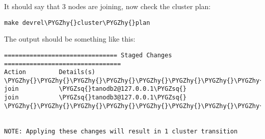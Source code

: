 \documentclass[letterpaper,10pt,english]{sphinxmanual}
\def\PYGZhy{\char`\-}
\def\PYGZsq{\char`\'}
\renewcommand\PYGZsq{\textquotesingle}
\begin{document}
It should say that 3 nodes are joining, now check the cluster plan:

\begin{Verbatim}[commandchars=\\\{\}]
make devrel\PYGZhy{}cluster\PYGZhy{}plan
\end{Verbatim}

The output should be something like this:

\begin{Verbatim}[commandchars=\\\{\}]
=============================== Staged Changes ================================
Action         Details(s)
\PYGZhy{}\PYGZhy{}\PYGZhy{}\PYGZhy{}\PYGZhy{}\PYGZhy{}\PYGZhy{}\PYGZhy{}\PYGZhy{}\PYGZhy{}\PYGZhy{}\PYGZhy{}\PYGZhy{}\PYGZhy{}\PYGZhy{}\PYGZhy{}\PYGZhy{}\PYGZhy{}\PYGZhy{}\PYGZhy{}\PYGZhy{}\PYGZhy{}\PYGZhy{}\PYGZhy{}\PYGZhy{}\PYGZhy{}\PYGZhy{}\PYGZhy{}\PYGZhy{}\PYGZhy{}\PYGZhy{}\PYGZhy{}\PYGZhy{}\PYGZhy{}\PYGZhy{}\PYGZhy{}\PYGZhy{}\PYGZhy{}\PYGZhy{}\PYGZhy{}\PYGZhy{}\PYGZhy{}\PYGZhy{}\PYGZhy{}\PYGZhy{}\PYGZhy{}\PYGZhy{}\PYGZhy{}\PYGZhy{}\PYGZhy{}\PYGZhy{}\PYGZhy{}\PYGZhy{}\PYGZhy{}\PYGZhy{}\PYGZhy{}\PYGZhy{}\PYGZhy{}\PYGZhy{}\PYGZhy{}\PYGZhy{}\PYGZhy{}\PYGZhy{}\PYGZhy{}\PYGZhy{}\PYGZhy{}\PYGZhy{}\PYGZhy{}\PYGZhy{}\PYGZhy{}\PYGZhy{}\PYGZhy{}\PYGZhy{}\PYGZhy{}\PYGZhy{}\PYGZhy{}\PYGZhy{}\PYGZhy{}\PYGZhy{}
join           \PYGZsq{}tanodb2@127.0.0.1\PYGZsq{}
join           \PYGZsq{}tanodb3@127.0.0.1\PYGZsq{}
\PYGZhy{}\PYGZhy{}\PYGZhy{}\PYGZhy{}\PYGZhy{}\PYGZhy{}\PYGZhy{}\PYGZhy{}\PYGZhy{}\PYGZhy{}\PYGZhy{}\PYGZhy{}\PYGZhy{}\PYGZhy{}\PYGZhy{}\PYGZhy{}\PYGZhy{}\PYGZhy{}\PYGZhy{}\PYGZhy{}\PYGZhy{}\PYGZhy{}\PYGZhy{}\PYGZhy{}\PYGZhy{}\PYGZhy{}\PYGZhy{}\PYGZhy{}\PYGZhy{}\PYGZhy{}\PYGZhy{}\PYGZhy{}\PYGZhy{}\PYGZhy{}\PYGZhy{}\PYGZhy{}\PYGZhy{}\PYGZhy{}\PYGZhy{}\PYGZhy{}\PYGZhy{}\PYGZhy{}\PYGZhy{}\PYGZhy{}\PYGZhy{}\PYGZhy{}\PYGZhy{}\PYGZhy{}\PYGZhy{}\PYGZhy{}\PYGZhy{}\PYGZhy{}\PYGZhy{}\PYGZhy{}\PYGZhy{}\PYGZhy{}\PYGZhy{}\PYGZhy{}\PYGZhy{}\PYGZhy{}\PYGZhy{}\PYGZhy{}\PYGZhy{}\PYGZhy{}\PYGZhy{}\PYGZhy{}\PYGZhy{}\PYGZhy{}\PYGZhy{}\PYGZhy{}\PYGZhy{}\PYGZhy{}\PYGZhy{}\PYGZhy{}\PYGZhy{}\PYGZhy{}\PYGZhy{}\PYGZhy{}\PYGZhy{}


NOTE: Applying these changes will result in 1 cluster transition


\end{Verbatim}
\end{document}
